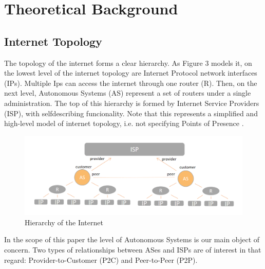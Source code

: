 \documentclass[conference, 11pt]{IEEEtran}
\begin{document}
\section{Theoretical Background}
\subsection{Internet Topology}

The topology of the internet forms a clear hierarchy. As Figure 3 models it, on the lowest level of the internet topology are Internet Protocol network interfaces (IPs). Multiple Ips can access the internet through one router (R). Then, on the next level, Autonomous Systems (AS) represent a set of routers under a single administration. The top of this hierarchy is formed by Internet Service Providers (ISP), with selfdescribing funcionality. Note that this represents a simplified and high-level model of internet topology, i.e. not specifying Points of Presence \cite{ASH}. 

\begin{figure}[htbp]
\centerline{\includegraphics[scale=0.26]{Graphics/hierarchy.PNG}}
\caption{Hierarchy of the Internet}
\label{fig}
\end{figure}


 In the scope of this paper the level of Autonomous Systems is our main object of concern. Two types of relationships between ASes and ISPs are of interest in that regard: Provider-to-Customer (P2C) and Peer-to-Peer (P2P). \\
\end{document}
